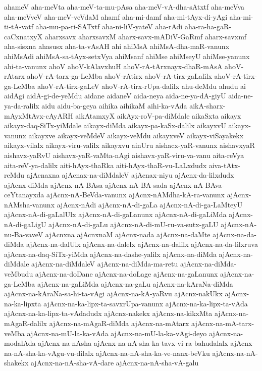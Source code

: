 {ahameV
aha-meVta
aha-meV-ta-mu-pAsa
aha-meV-vA-dha-sAtxtf
aha-meVva
aha-meVveV
aha-meV-veVdaM
ahamf
aha-mi-damf
aha-mi-tAyx-di-yAgi
aha-mi-ti-tA-vatf
aha-mu-pa-ri-SATxtf
aha-ni-liV-yateV
aha-rAdi
aha-ra-ha-gaR-caCxnatxyX
aharxsavx
aharxsavxM
aharx-savx-mADiV-GaRmf
aharx-savxmf
aha-sisxna
ahasusx
aha-ta-vAsAH
ahi
ahiMsA
ahiMsA-dha-maR-vanunx
ahiMsAdi
ahiMsA-sa-tAyx-setxVya
ahiMsanf
ahiMse
ahiMseyU
ahiMse-yanunx
ahi-ta-vanunx
ahoV
ahoV-kAlavxhuH
ahoV-rA-tArxnayx-dhaR-mAsA
ahoV-rAtarx
ahoV-rA-tarx-ga-LeMba
ahoV-rAtirx
ahoV-rA-tirx-gaLalilx
ahoV-rA-tirx-ga-LeMba
ahoV-rA-tirx-gaLeV
ahoV-rA-tirx-rUpa-dalilx
ahu-deMdu
ahudu
ai
aidAgi
aidA-gi-de-yeMdu
aidane
aidaneV
aida-neya
aida-ne-ya-dA-giyU
aida-ne-ya-da-ralilx
aidu
aidu-ba-geya
aihika
aihikaM
aihi-ka-vAda
aikA-sharx-mAyxMtAvx-cAyARH
aikAtamxyX
aikAyx-roV-pa-diMdale
aikaSxta
aikayx
aikayx-daq-SiTx-yiMdale
aikayx-diMda
aikayx-pa-kaSx-dalilx
aikayxvU
aikayx-vanunx
aikayxve
aikayx-veMdeV
aikayx-veMdu
aikayxveV
aikayx-viSayakekx
aikayx-vilalx
aikayx-viru-valilx
aikayxvu
ainUru
aishacx-yaR-vanunx
aishavxyaR
aishavx-yaRvU
aishavx-yaR-vaMta-nAgi
aishavx-yaR-viru-va-vanu
aita-reVya
aita-reV-ya-dalilx
aiti-hAyx-thaRka
aiti-hAyx-thaR-vu-LaLxdudx
aiva-tAtx-reMdu
ajAcnaxna
ajAcnax-na-diMdaleV
ajAcnax-niyu
ajAcnx-da-lilxdudx
ajAcnx-diMda
ajAcnx-nA-BAsa
ajAcnx-nA-BA-sada
ajAcnx-nA-BAva-ceYtanayxda
ajAcnx-nA-BeVda-vanunx
ajAcnx-nAMdha-kA-ra-vanunx
ajAcnx-nAMsha-vanunx
ajAcnx-nAdi
ajAcnx-nA-di-gaLa
ajAcnx-nA-di-ga-LaMteyU
ajAcnx-nA-di-gaLalUlx
ajAcnx-nA-di-gaLanunx
ajAcnx-nA-di-gaLiMda
ajAcnx-nA-di-gaLigU
ajAcnx-nA-di-gaLu
ajAcnx-nA-di-mU-ru-va-sutx-gaLU
ajAcnx-nA-nu-Ba-vaveV
ajAcnxna
ajAcnxnaM
ajAcnx-nada
ajAcnx-na-daMte
ajAcnx-na-da-diMda
ajAcnx-na-dalUlx
ajAcnx-na-dalelx
ajAcnx-na-dalilx
ajAcnx-na-da-lilxruva
ajAcnx-na-daq-SiTx-yiMda
ajAcnx-na-dashe-yalilx
ajAcnx-na-diMda
ajAcnx-na-diMdale
ajAcnx-na-diMdaleV
ajAcnx-na-diMda-ma-retu
ajAcnx-na-diMda-veMbudu
ajAcnx-na-doDane
ajAcnx-na-doLage
ajAcnx-na-gaLanunx
ajAcnx-na-ga-LeMba
ajAcnx-na-gaLiMda
ajAcnx-na-gaLu
ajAcnx-na-kAraNa-diMda
ajAcnx-na-kAraNa-sa-hi-ta-vAgi
ajAcnx-na-kA-yaRvu
ajAcnx-nakUkx
ajAcnx-na-ka-lipxta
ajAcnx-na-ka-lipx-ta-savxrUpa-vanunx
ajAcnx-na-ka-lipx-ta-vAda
ajAcnx-na-ka-lipx-ta-vAdadudx
ajAcnx-nakekx
ajAcnx-na-kikxMta
ajAcnx-na-mAgaR-dalilx
ajAcnx-na-mAgaR-diMda
ajAcnx-na-mAtarx
ajAcnx-na-mA-tarx-veMba
ajAcnx-na-mU-la-ka-vAda
ajAcnx-na-mU-la-ka-vAgi-deyo
ajAcnx-na-modalAda
ajAcnx-na-nAsha
ajAcnx-na-nA-sha-ka-tavx-vi-ra-bahudalalx
ajAcnx-na-nA-sha-ka-vAgu-vu-dilalx
ajAcnx-na-nA-sha-ka-ve-nanx-beVku
ajAcnx-na-nA-shakekx
ajAcnx-na-nA-sha-vA-dare
ajAcnx-na-nA-sha-vA-galu
}
